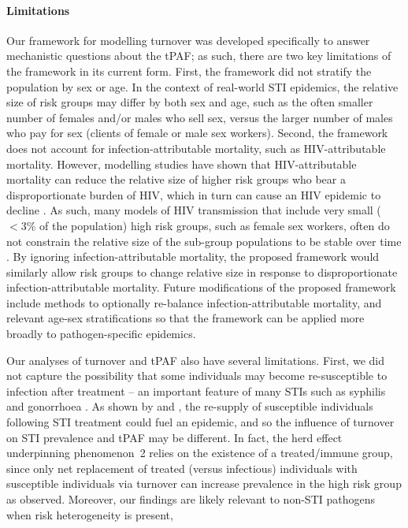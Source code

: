\paragraph{Limitations}
Our framework for modelling turnover was developed
specifically to answer mechanistic questions about the tPAF;
as such, there are two key limitations of the framework in its current form.
First, the framework did not stratify the population by sex or age.
In the context of real-world STI epidemics,
the relative size of risk groups may differ by both sex and age,
such as the often smaller number of females and/or males who sell sex,
versus the larger number of males who pay for sex (clients of female or male sex workers).
Second, the framework does not account for
infection-attributable mortality, such as HIV-attributable mortality.
However, modelling studies have shown that HIV-attributable mortality can reduce the
relative size of higher risk groups who bear a disproportionate burden of HIV,
which in turn can cause an HIV epidemic to decline \citep{Boily1997}.
As such, many models of HIV transmission that include
very small ($<3\%$ of the population) high risk groups, such as female sex workers,
often do not constrain the relative size
of the sub-group populations to be stable over time \citep{Pickles2013}.
By ignoring infection-attributable mortality,
the proposed framework would similarly allow risk groups to change relative size
in response to disproportionate infection-attributable mortality.
Future modifications of the proposed framework include methods to optionally re-balance
infection-attributable mortality, and relevant age-sex stratifications so that
the framework can be applied more broadly to pathogen-specific epidemics.
\par
Our analyses of turnover and tPAF also have several limitations.
First, we did not capture the possibility that some individuals may become
re-susceptible to infection after treatment
-- an important feature of many STIs such as syphilis and gonorrhoea \citep{Fenton2008}.
As shown by \citet{Fenton2008} and \citet{Pourbohloul2003},
the re-supply of susceptible individuals following STI treatment
could fuel an epidemic, and so the influence of turnover on
STI prevalence and tPAF may be different.
In fact, the herd effect underpinning phenomenon~2
relies on the existence of a treated/immune group,
since only net replacement of treated (versus infectious) individuals
with susceptible individuals via turnover can increase prevalence
in the high risk group as observed.
Moreover, our findings are likely relevant to non-STI pathogens when risk heterogeneity is present,
